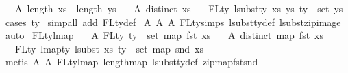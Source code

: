 \begin{isabellebody}
\ \ \ A{}{\isacharcolon}{\kern0pt}\ {\isachardoublequoteopen}length\ xs\ {\isacharequal}{\kern0pt}\ length\ ys{\isachardoublequoteclose}\isanewline
\ \ \ A{}{\isacharcolon}{\kern0pt}\ {\isachardoublequoteopen}distinct\ xs{\isachardoublequoteclose}\isanewline
\ \ \ {\isachardoublequoteopen}FLty\ {\isacharparenleft}{\kern0pt}lsubst{\isacharunderscore}{\kern0pt}ty\ xs\ ys\ ty{\isacharparenright}{\kern0pt}\ {\isacharequal}{\kern0pt}\ set\ ys{\isachardoublequoteclose}\isanewline
%
\isadelimproof
%
\endisadelimproof
%
\isatagproof
{}\isamarkupfalse%
\ {\isacharparenleft}{\kern0pt}cases\ ty{\isacharparenright}{\kern0pt}\isanewline
{}\isamarkupfalse%
\ {\isacharparenleft}{\kern0pt}simp{\isacharunderscore}{\kern0pt}all\ add{\isacharcolon}{\kern0pt}\ FLty{\isacharunderscore}{\kern0pt}def{\isacharparenright}{\kern0pt}\isanewline
{}\isamarkupfalse%
\ A{}\ A{}\ A{}\ FLty{\isachardot}{\kern0pt}simps{\isacharparenleft}{\kern0pt}{}{\isacharparenright}{\kern0pt}\ lsubst{\isacharunderscore}{\kern0pt}ty{\isacharunderscore}{\kern0pt}def\ lsubst{\isacharunderscore}{\kern0pt}zip{\isacharunderscore}{\kern0pt}image\ \isamarkupfalse%
\ auto%
\endisatagproof
{\isafoldproof}%
%
\isadelimproof
\isanewline
%
\endisadelimproof
\isanewline
\isanewline
\isanewline
{}\isamarkupfalse%
\ FL{\isacharunderscore}{\kern0pt}ty{\isacharunderscore}{\kern0pt}lmap{}{\isacharcolon}{\kern0pt}\isanewline
\ \ \ A{}{\isacharcolon}{\kern0pt}\ {\isachardoublequoteopen}FLty\ ty\ {\isacharequal}{\kern0pt}\ set\ {\isacharparenleft}{\kern0pt}map\ fst\ xs{\isacharparenright}{\kern0pt}{\isachardoublequoteclose}\isanewline
\ \ \ A{}{\isacharcolon}{\kern0pt}\ {\isachardoublequoteopen}distinct\ {\isacharparenleft}{\kern0pt}map\ fst\ xs{\isacharparenright}{\kern0pt}{\isachardoublequoteclose}\isanewline
\ \ \ {\isachardoublequoteopen}FLty\ {\isacharparenleft}{\kern0pt}lmap{\isacharunderscore}{\kern0pt}ty\ {\isacharparenleft}{\kern0pt}lsubst\ xs{\isacharparenright}{\kern0pt}\ ty{\isacharparenright}{\kern0pt}\ {\isacharequal}{\kern0pt}\ set\ {\isacharparenleft}{\kern0pt}map\ snd\ xs{\isacharparenright}{\kern0pt}{\isachardoublequoteclose}\isanewline
%
\isadelimproof
%
\endisadelimproof
%
\isatagproof
{}\isamarkupfalse%
\ {\isacharparenleft}{\kern0pt}metis\ A{}\ A{}\ FL{\isacharunderscore}{\kern0pt}ty{\isacharunderscore}{\kern0pt}lmap\ length{\isacharunderscore}{\kern0pt}map\ lsubst{\isacharunderscore}{\kern0pt}ty{\isacharunderscore}{\kern0pt}def\ zip{\isacharunderscore}{\kern0pt}map{\isacharunderscore}{\kern0pt}fst{\isacharunderscore}{\kern0pt}snd{\isacharparenright}{\kern0pt}%

\end{isabellebody}
